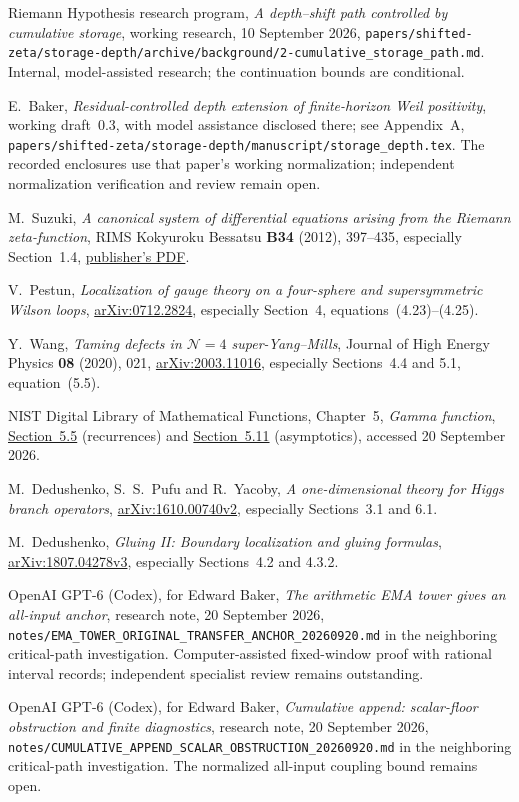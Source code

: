 Riemann Hypothesis research program,
\emph{A depth--shift path controlled by cumulative storage},
working research, 10 September 2026,
\nolinkurl{papers/shifted-zeta/storage-depth/archive/background/2-cumulative_storage_path.md}.
Internal, model-assisted research; the continuation bounds are
conditional.

E.~Baker, \emph{Residual-controlled depth extension of finite-horizon
Weil positivity}, working draft~0.3, with model assistance disclosed
there; see Appendix~A,
\nolinkurl{papers/shifted-zeta/storage-depth/manuscript/storage_depth.tex}.
The recorded enclosures use that paper's working normalization;
independent normalization verification and review remain open.

M.~Suzuki, \emph{A canonical system of differential equations arising
from the Riemann zeta-function}, RIMS Kokyuroku Bessatsu
\textbf{B34} (2012), 397--435, especially Section~1.4,
\href{https://www.kurims.kyoto-u.ac.jp/~kenkyubu/bessatsu/open/B34/pdf/B34_023.pdf}{publisher's PDF}.


V.~Pestun, \emph{Localization of gauge theory on a four-sphere and
supersymmetric Wilson loops},
\href{https://arxiv.org/abs/0712.2824}{arXiv:0712.2824},
especially Section~4, equations~(4.23)--(4.25).

Y.~Wang, \emph{Taming defects in $\mathcal N=4$ super-Yang--Mills},
Journal of High Energy Physics \textbf{08} (2020), 021,
\href{https://arxiv.org/abs/2003.11016}{arXiv:2003.11016},
especially Sections~4.4 and 5.1, equation~(5.5).

NIST Digital Library of Mathematical Functions,
Chapter~5, \emph{Gamma function},
\href{https://dlmf.nist.gov/5.5}{Section~5.5} (recurrences) and
\href{https://dlmf.nist.gov/5.11}{Section~5.11} (asymptotics),
accessed 20 September 2026.

M.~Dedushenko, S.~S.~Pufu and R.~Yacoby,
\emph{A one-dimensional theory for Higgs branch operators},
\href{https://arxiv.org/abs/1610.00740v2}{arXiv:1610.00740v2},
especially Sections~3.1 and 6.1.

M.~Dedushenko, \emph{Gluing II: Boundary localization and gluing formulas},
\href{https://arxiv.org/abs/1807.04278v3}{arXiv:1807.04278v3},
especially Sections~4.2 and 4.3.2.

OpenAI GPT-6 (Codex), for Edward Baker,
\emph{The arithmetic EMA tower gives an all-input anchor},
research note, 20 September 2026,
\nolinkurl{notes/EMA_TOWER_ORIGINAL_TRANSFER_ANCHOR_20260920.md}
in the neighboring critical-path investigation.
Computer-assisted fixed-window proof with rational interval records;
independent specialist review remains outstanding.

OpenAI GPT-6 (Codex), for Edward Baker,
\emph{Cumulative append: scalar-floor obstruction and finite diagnostics},
research note, 20 September 2026,
\nolinkurl{notes/CUMULATIVE_APPEND_SCALAR_OBSTRUCTION_20260920.md}
in the neighboring critical-path investigation.
The normalized all-input coupling bound remains open.
